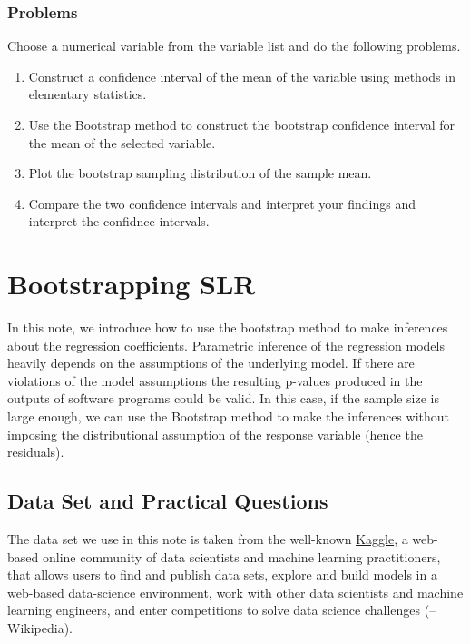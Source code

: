 \documentclass[
]{book}
\begin{document}
\hypertarget{problems}{%
\subsection{Problems}\label{problems}}

Choose a numerical variable from the variable list and do the following problems.

\begin{enumerate}
\def\labelenumi{\arabic{enumi}.}
\item
  Construct a confidence interval of the mean of the variable using methods in elementary statistics.
\item
  Use the Bootstrap method to construct the bootstrap confidence interval for the mean of the selected variable.
\item
  Plot the bootstrap sampling distribution of the sample mean.
\item
  Compare the two confidence intervals and interpret your findings and interpret the confidnce intervals.
\end{enumerate}

\hypertarget{bootstrapping-slr}{%
\chapter{Bootstrapping SLR}\label{bootstrapping-slr}}

In this note, we introduce how to use the bootstrap method to make inferences about the regression coefficients. Parametric inference of the regression models heavily depends on the assumptions of the underlying model. If there are violations of the model assumptions the resulting p-values produced in the outputs of software programs could be valid. In this case, if the sample size is large enough, we can use the Bootstrap method to make the inferences without imposing the distributional assumption of the response variable (hence the residuals).

\hypertarget{data-set-and-practical-questions}{%
\section{Data Set and Practical Questions}\label{data-set-and-practical-questions}}

The data set we use in this note is taken from the well-known \href{https://www.kaggle.com/}{Kaggle}, a web-based online community of data scientists and machine learning practitioners, that allows users to find and publish data sets, explore and build models in a web-based data-science environment, work with other data scientists and machine learning engineers, and enter competitions to solve data science challenges (-- Wikipedia).
\end{document}
